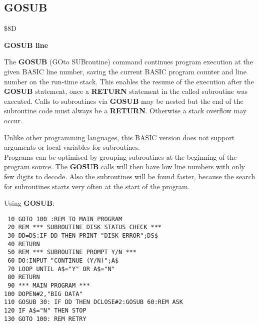 
\newpage
\subsection{GOSUB}
\begin{description}[leftmargin=2cm,style=nextline]
\item [Token:] \$8D
\item [Format:] {\bf GOSUB line}
\item [Usage:] The {\bf GOSUB} (GOto SUBroutine)
               command continues program
               execution at the given BASIC line number,
               saving the current BASIC program counter
               and line number on the run-time stack.
               This enables the resume of the execution after
               the {\bf GOSUB} statement, once a {\bf RETURN}
               statement in the called subroutine was executed.
               Calls to subroutines via {\bf GOSUB} may be nested
               but the end of the subroutine code must always
               be a {\bf RETURN}. Otherwise a stack overflow
               may occur.

\item [Remarks:] Unlike other programming languages, this BASIC
               version does not support arguments or local
               variables for subroutines. \\
               Programs can be optimised by grouping subroutines
               at the beginning of the program source. The
               {\bf GOSUB} calls will then have low line numbers
               with only few digits to decode. Also the subroutines
               will be found faster, because the search for subroutines
               starts very often at the start of the program.
\item [Example:] Using {\bf GOSUB}:
\begin{tcolorbox}[colback=black,coltext=white]
\verbatimfont{\codefont}
\begin{verbatim}
 10 GOTO 100 :REM TO MAIN PROGRAM
 20 REM *** SUBROUTINE DISK STATUS CHECK ***
 30 DD=DS:IF DD THEN PRINT "DISK ERROR";DS$
 40 RETURN
 50 REM *** SUBROUTINE PROMPT Y/N ***
 60 DO:INPUT "CONTINUE (Y/N)";A$
 70 LOOP UNTIL A$="Y" OR A$="N"
 80 RETURN
 90 *** MAIN PROGRAM ***
100 DOPEN#2,"BIG DATA"
110 GOSUB 30: IF DD THEN DCLOSE#2:GOSUB 60:REM ASK
120 IF A$="N" THEN STOP
130 GOTO 100: REM RETRY
\end{verbatim}
\end{tcolorbox}
\end{description}

